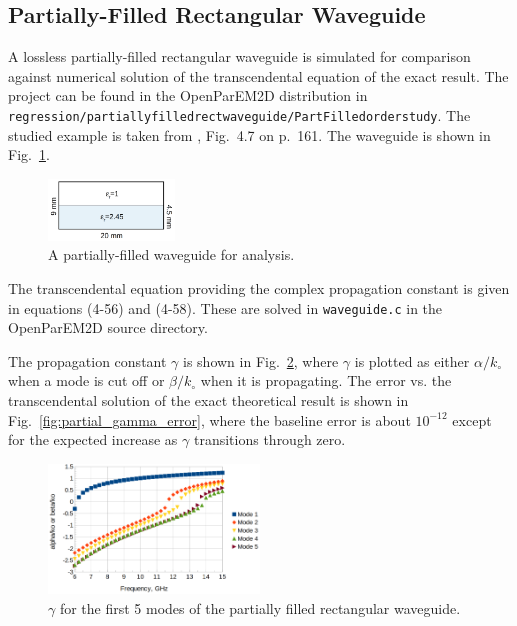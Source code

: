 \documentclass[titlepage]{article}
\renewcommand\_{\textunderscore\linebreak[1]}
\begin{document}
\subsection{Partially-Filled Rectangular Waveguide}

A lossless partially-filled rectangular waveguide is simulated for comparison against numerical solution of the transcendental equation of the exact result. The project can be found in the OpenParEM2D distribution in \texttt{regression/partially\_filled\_rect\_waveguide/PartFilled\_order\_6\_study}.  The studied example is taken from \cite{Harrington}, Fig.~4.7 on p.~161.  The waveguide is shown in Fig.~\ref{fig:partial_drawing}.
\begin{figure}[H]
  \centering
  \includegraphics[width=0.3\textwidth]{../regression/OpenParEM2D/partially_filled_rect_waveguide/PartFilled_order_6_study/screenshots/partial_drawing}
  \caption{A partially-filled waveguide for analysis.}
  \label{fig:partial_drawing}
\end{figure}

The transcendental equation providing the complex propagation constant is given in \cite{Harrington} equations (4-56) and (4-58).  These are solved in \texttt{waveguide.c} in the OpenParEM2D source directory.

The propagation constant $\gamma$ is shown in Fig.~\ref{fig:partial_gamma}, where $\gamma$ is plotted as either $\alpha/k_{\circ}$ when a mode is cut off or $\beta/k_{\circ}$ when it is propagating.  The error vs. the transcendental solution of the exact theoretical result is shown in Fig.~\ref{fig:partial_gamma_error}, where the baseline error is about $10^{-12}$ except for the expected increase as $\gamma$ transitions through zero.

\begin{figure}[H]
  \centering
  \includegraphics[width=0.5\textwidth]{../regression/OpenParEM2D/partially_filled_rect_waveguide/PartFilled_order_6_study/screenshots/partial_gamma}
  \caption{$\gamma$ for the first 5 modes of the partially filled rectangular waveguide.}
  \label{fig:partial_gamma}
\end{figure}
\end{document}

